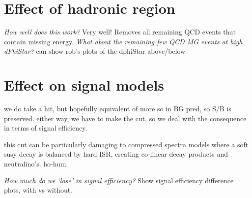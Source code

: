 \section{Effect of hadronic region}

\emph{How well does this work?} Very well! Removes all remaining QCD events that
contain missing energy. \emph{What about the remaining few QCD MG events at high
dPhiStar?} can show rob's plots of the dphiStar above/below

\section{Effect on signal models}
we do take a hit, but hopefully equivalent of more so in BG pred, so S/B is
preserved. either way, we have to make the cut, so we deal with the consequence
in terms of signal efficiency.

this cut can be particularly damaging to compressed spectra models where a
soft susy decay is balanced by hard ISR, creating co-linear decay products and
neutralino's. ho-hum.

\emph{How much do we `lose' in signal efficiency?} Show signal efficiency
difference plots, with vs without.

